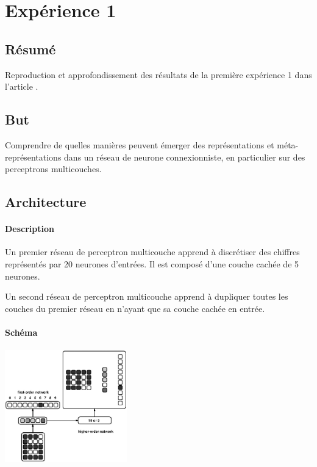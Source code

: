 \documentclass[a4paper,12pt]{article}
\renewcommand{\sectionmark}[1]{\markright{#1}}
\begin{document}
  \section*{Expérience 1} \sectionmark{EXPÉRIENCE 1}
    \subsection*{Résumé}
      Reproduction et approfondissement des résultats de la première expérience 1 dans l'article 
      \cite{Cleeremans_2007}. 

    
    \subsection*{But}
      Comprendre de quelles manières peuvent émerger des représentations et méta-représentations dans 
      un réseau de neurone connexionniste, en particulier sur des perceptrons multicouches.
    
    
    \subsection*{Architecture}
      \paragraph*{Description}
	Un premier réseau de perceptron multicouche apprend à discrétiser des chiffres représentés
	par 20 neurones d'entrées. Il est composé d'une couche cachée de 5 neurones.
	
	Un second réseau de perceptron multicouche apprend à dupliquer toutes les couches du premier
	réseau en n'ayant que sa couche cachée en entrée.

      \paragraph*{Schéma}
	\begin{center}
	  \includegraphics[width=200px]{../cleeremans_2007/digit_reco/digit_reco.png}
	\end{center}
	
\end{document}
